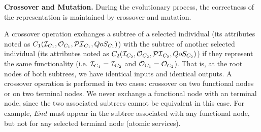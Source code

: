 
\textbf{Crossover and Mutation.} 
During the evolutionary process, the correctness of the representation is maintained by crossover and mutation. 

A crossover operation exchanges a subtree of a selected individual (its attributes noted as $C_1 (\mathcal{I}_{C_1}, \mathcal{O}_{C_1}, \mathcal{PI}_{C_1}, QoS_{C_1})$) with the subtree of another selected individual (its attributes noted as $C_2 (\mathcal{I}_{C_2}, \mathcal{O}_{C_2}, \mathcal{PI}_{C_2}, QoS_{C_2})$) 
if they represent the same functionality (i.e. $\mathcal{I}_{C_1} = \mathcal{I}_{C_2}$ and $\mathcal{O}_{C_1} = \mathcal{O}_{C_2}$). That is, at the root nodes of both subtrees, we have identical inputs and identical outputs. A crossover operation is performed in two cases: crossover on two functional nodes or on two terminal nodes. We never exchange a functional node with an terminal node, since the two associated subtrees cannot be equivalent in this case. For example, $End$ must appear in the subtree associated with any functional node, but not for any selected terminal node (atomic services). 

